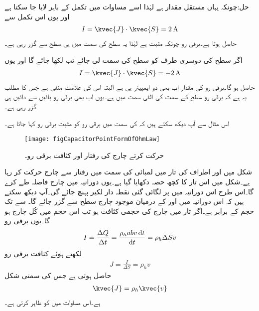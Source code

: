 حل:چونکہ  یہاں  مستقل مقدار ہے لہٰذا اسے مساوات  میں تکمل کے باہر لایا جا سکتا ہے اور یوں اس تکمل سے
\begin{align*}
I=\kvec{J} \cdot \kvec{S}= \SI{2}{\ampere}
\end{align*} 
حاصل ہوتا ہے۔برقی رو چونکہ مثبت ہے لہٰذا یہ سطح کی سمت میں ہی سطح سے گزر رہی ہے۔

اگر سطح کی دوسری طرف کو سطح کی سمت لی جائے تب  لکھا جائے گا اور یوں
\begin{align*}
I=\kvec{J} \cdot \kvec{S}= \SI{-2}{\ampere}
\end{align*} 
حاصل ہو گا۔برقی رو کی مقدار اب بھی دو ایمپیئر ہی ہے البتہ اس کی علامت منفی ہے جس کا مطلب یہ ہے کہ برقی رو سطح کے سمت کی الٹی سمت میں ہے۔یوں اب بھی برقی رو بائیں سے دائیں ہی  گزر رہی ہے۔

%

اس مثال سے آپ دیکھ سکتے ہیں کہ  کی سمت میں برقی رو کو مثبت برقی رو کہا جاتا ہے۔
\begin{figure}
\centering
\texttt{[image: figCapacitorPointFormOfOhmLaw]}
\caption{حرکت کرتے چارج کی رفتار اور کثافت برقی رو۔}
\label{شکل_کپیسٹر_حرکت_کرتا_چارج_اور_کثافت_برقی_رو}
\end{figure}

شکل  میں  اور  اطراف کی تار میں لمبائی کی سمت میں  رفتار سے چارج حرکت کر رہا ہے۔شکل میں اس تار کا کچھ حصہ دکھایا گیا ہے۔یوں  دورانیہ میں چارج  فاصلہ طے کرے گا۔اس طرح اس دورانیہ میں  پر لگائی گئی نقطہ دار لکیر  پہنچ جائے گی۔آپ دیکھ سکتے ہیں کہ اس دورانیہ میں  اور  کے درمیان موجود چارج سطح  سے گزر جائے گا۔ سے  تک حجم  کے برابر ہے۔اگر تار میں چارج کی حجمی کثافت  ہو تب اس حجم میں  کُل چارج  ہو گا۔یوں برقی رو
\begin{align*}
I=\frac{\Delta Q}{\Delta t}=\frac{\rho_h a b v \dif t}{\dif t}=\rho_h \Delta S v
\end{align*}
لکھتے ہوئے  کثافت برقی رو
\begin{align*}
J=\frac{I}{\Delta S}=\rho_h v
\end{align*}
حاصل ہوتی ہے جس کی سمتی شکل
\begin{align}\label{مساوات_کپیسٹر_کثافت_رو_مساوی_کثافت_چارج_ضرب_رفتار}
\kvec{J}=\rho_h \kvec{v}
\end{align}
ہے۔اس مساوات میں   کو ظاہر کرتی ہے۔

